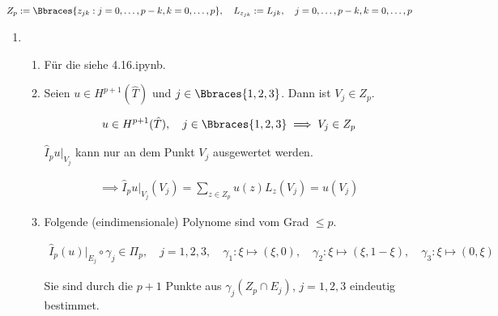 
  \begin{solution}

  \begin{align*}
    Z_p
    :=
    \Bbraces{z_{jk}: j = 0, \dots, p - k, k = 0, \dots, p},
    \quad
    L_{z_{jk}}
    :=
    L_{jk},
    \quad
    j = 0, \dots, p - k, k = 0, \dots, p
  \end{align*}

  \begin{enumerate}[label = \textbf{\alph*)}]

    \item

    \begin{enumerate}[label = (\roman*)]

      \item Für die  siehe 4.16.ipynb.

      \item Seien $u \in H^{p+1}(\hat T)$ und $j \in \Bbraces{1, 2, 3}$.
      Dann ist $V_j \in Z_p$.

      \begin{align*}
        u \in H^{p+1}(\hat T),
        \quad
        j \in \Bbraces{1, 2, 3}
        \implies
        V_j \in Z_p
      \end{align*}

      $\hat I_p u|_{V_j}$ kann nur an dem Punkt $V_j$ ausgewertet werden.

      \begin{align*}
        \implies
        \hat I_p u|_{V_j}(V_j)
        =
        \sum_{z \in Z_p}
        u(z) L_z(V_j)
        =
        u(V_j)
      \end{align*}

      \item Folgende (eindimensionale) Polynome sind vom Grad $\leq p$.

      \begin{align*}
        \hat I_p(u)|_{E_j} \circ \gamma_j \in \Pi_p,
        \quad
        j = 1, 2, 3,
        \quad
        \gamma_1: \xi \mapsto (\xi, 0),
        \quad
        \gamma_2: \xi \mapsto (\xi, 1 - \xi),
        \quad
        \gamma_3: \xi \mapsto (0, \xi)
      \end{align*}

      Sie sind durch die $p + 1$ Punkte aus $\gamma_j(Z_p \cap E_j)$, $j = 1, 2, 3$ eindeutig bestimmet.


\end{enumerate}
\end{enumerate}
\end{solution}

